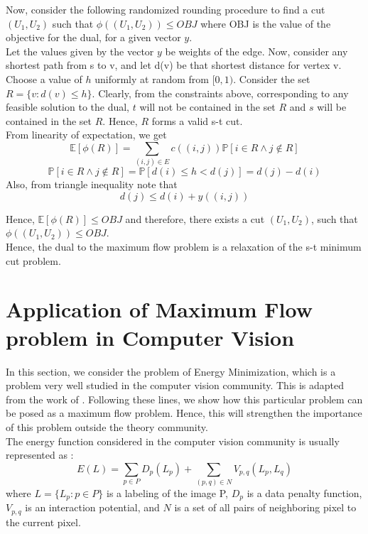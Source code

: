 \documentclass[BTech]{iitmdiss}
\begin{document}
	  Now, consider the following randomized rounding procedure to find a cut $(U_1, U_2)$ such that $\phi((U_1, U_2)) \leq OBJ$ where OBJ is 
	  the value of the objective for the dual, for a given vector $y$. \\
	  
	  Let the values given by the vector $y$ be weights of the edge. Now, consider any shortest path from s to v, and let d(v) be that 
	  shortest distance for vertex v. Choose a value of $h$ uniformly at random from $[0,1)$. Consider the set 
	  $R = \{v:d(v) \leq h\}$. Clearly, from the constraints above, corresponding to any feasible solution to the dual, $t$ will not be contained 
	  in the set $R$ and $s$ will be contained in the set $R$. Hence, $R$ forms a valid s-t cut. \\
	  
	  From linearity of expectation, we get
	  $$\mathbb{E}[\phi(R)] = \displaystyle\sum_{(i,j) \in E} c((i,j)) \mathbb{P}[i \in R \wedge j \notin R]$$
	  $$\mathbb{P}[i \in R \wedge j \notin R] = \mathbb{P}[d(i) \leq h < d(j)] = d(j)-d(i)$$
	  Also, from triangle inequality note that 
	  $$d(j) \leq d(i) + y((i,j))$$
	  
	  Hence, $\mathbb{E}[\phi(R)] \leq OBJ$ and therefore, there exists a cut $(U_1,U_2)$, such that $\phi((U_1, U_2)) \leq OBJ$. \\
	  
	  Hence, the dual to the maximum flow problem is a relaxation of the s-t minimum cut problem.
	  
	  \section{Application of Maximum Flow problem in Computer Vision}
	    In this section, we consider the problem of Energy Minimization, which is a problem very well studied in the computer vision community.
	  This is adapted from the work of \cite{Boykov:2004:ECM:1018034.1018355}. Following these lines, we show how this particular problem can be posed as a maximum flow problem. Hence, this will
	  strengthen the importance of this problem outside the theory community. \\
	  
	  The energy function considered in the computer vision community is usually represented as :
	  $$E(L) = \displaystyle\sum_{p \in P} D_{p}(L_{p}) + \displaystyle\sum_{(p,q) \in N} V_{p,q}(L_p, L_q)$$
	  where 
	  $L = \{L_p : p \in P\}$ is a labeling of the image P, $D_p$ is a data penalty function, $V_{p,q}$ is an interaction potential, and 
	  $N$ is a set of all pairs of neighboring pixel to the current pixel. \\
	  
\end{document}
